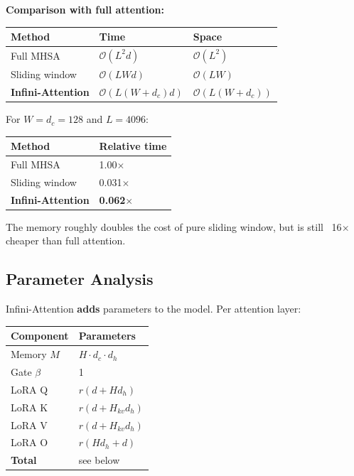 \textbf{Comparison with full attention:}

\begin{table}[H]
\centering
\small
\begin{tabular}{lll}
\toprule
\textbf{Method} & \textbf{Time} & \textbf{Space} \\
\midrule
Full MHSA & $\mathcal{O}(L^2 d)$ & $\mathcal{O}(L^2)$ \\
Sliding window & $\mathcal{O}(L W d)$ & $\mathcal{O}(L W)$ \\
\textbf{Infini-Attention} & $\mathcal{O}(L(W + d_c) d)$ & $\mathcal{O}(L(W + d_c))$ \\
\bottomrule
\end{tabular}
\end{table}

For $W = d_c = 128$ and $L = 4096$:

\begin{table}[H]
\centering
\small
\begin{tabular}{ll}
\toprule
\textbf{Method} & \textbf{Relative time} \\
\midrule
Full MHSA & 1.00$\times$ \\
Sliding window & 0.031$\times$ \\
\textbf{Infini-Attention} & \textbf{0.062$\times$} \\
\bottomrule
\end{tabular}
\end{table}

The memory roughly doubles the cost of pure sliding window, but is still 
~16$\times$ cheaper than full attention.

\subsection{Parameter Analysis}

Infini-Attention \textbf{adds} parameters to the model. Per attention layer:

\begin{table}[H]
\centering
\small
\begin{tabular}{ll}
\toprule
\textbf{Component} & \textbf{Parameters} \\
\midrule
Memory $M$ & $H \cdot d_c \cdot d_h$ \\
Gate $\beta$ & 1 \\
LoRA Q & $r(d + H d_h)$ \\
LoRA K & $r(d + H_{kv} d_h)$ \\
LoRA V & $r(d + H_{kv} d_h)$ \\
LoRA O & $r(H d_h + d)$ \\
\textbf{Total} & see below \\
\bottomrule
\end{tabular}
\end{table}

